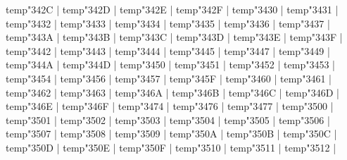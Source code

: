 {{\:temp{\mathchar"342C} |%
\:temp{\mathchar"342D} |%
\:temp{\mathchar"342E} |%
\:temp{\mathchar"342F} |%
\:temp{\mathchar"3430} |%
\:temp{\mathchar"3431} |%
\:temp{\mathchar"3432} |%
\:temp{\mathchar"3433} |%
\:temp{\mathchar"3434} |%
\:temp{\mathchar"3435} |%
\:temp{\mathchar"3436} |%
\:temp{\mathchar"3437} |%
\:temp{\mathchar"343A} |%
\:temp{\mathchar"343B} |%
\:temp{\mathchar"343C} |%
\:temp{\mathchar"343D} |%
\:temp{\mathchar"343E} |%
\:temp{\mathchar"343F} |%
\:temp{\mathchar"3442} |%
\:temp{\mathchar"3443} |%
\:temp{\mathchar"3444} |%
\:temp{\mathchar"3445} |%
\:temp{\mathchar"3447} |%
\:temp{\mathchar"3449} |%
\:temp{\mathchar"344A} |%
\:temp{\mathchar"344D} |%
\:temp{\mathchar"3450} |%
\:temp{\mathchar"3451} |%
\:temp{\mathchar"3452} |%
\:temp{\mathchar"3453} |%
\:temp{\mathchar"3454} |%
\:temp{\mathchar"3456} |%
\:temp{\mathchar"3457} |%
\:temp{\mathchar"345F} |%
\:temp{\mathchar"3460} |%
\:temp{\mathchar"3461} |%
\:temp{\mathchar"3462} |%
\:temp{\mathchar"3463} |%
\:temp{\mathchar"346A} |%
\:temp{\mathchar"346B} |%
\:temp{\mathchar"346C} |%
\:temp{\mathchar"346D} |%
\:temp{\mathchar"346E} |%
\:temp{\mathchar"346F} |%
\:temp{\mathchar"3474} |%
\:temp{\mathchar"3476} |%
\:temp{\mathchar"3477} |%
\:temp{\mathchar"3500} |%
\:temp{\mathchar"3501} |%
\:temp{\mathchar"3502} |%
\:temp{\mathchar"3503} |%
\:temp{\mathchar"3504} |%
\:temp{\mathchar"3505} |%
\:temp{\mathchar"3506} |%
\:temp{\mathchar"3507} |%
\:temp{\mathchar"3508} |%
\:temp{\mathchar"3509} |%
\:temp{\mathchar"350A} |%
\:temp{\mathchar"350B} |%
\:temp{\mathchar"350C} |%
\:temp{\mathchar"350D} |%
\:temp{\mathchar"350E} |%
\:temp{\mathchar"350F} |%
\:temp{\mathchar"3510} |%
\:temp{\mathchar"3511} |%
\:temp{\mathchar"3512} |%
}}

